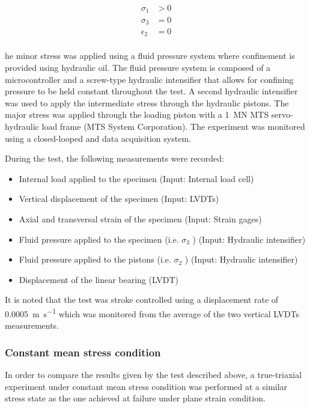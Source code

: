 \begin{align*}
    \sigma_1 &> 0 \\
    \sigma_3 &= 0 \\
    \epsilon_2&= 0 \\
\end{align*}

he minor stress was applied using a fluid pressure system where confinement is provided using hydraulic oil. The fluid pressure system is composed of a microcontroller and a screw-type hydraulic intensifier that allows for confining pressure to be held constant throughout the test. A second hydraulic intensifier was used to apply the intermediate stress through the hydraulic pistons. The major stress was applied through the loading piston with a \SI{1}{\mega\newton} MTS servo-hydraulic load frame (MTS System Corporation). The experiment was monitored using a closed-looped and data acquisition system. 

During the test, the following measurements were recorded: 

\begin{itemize}
    \item Internal load applied to the specimen (Input: Internal load cell)
    \item Vertical displacement of the specimen (Input: LVDTs)
    \item Axial and transversal strain of the specimen (Input: Strain gages)
    \item Fluid pressure applied to the specimen (i.e. $\sigma_3$ ) (Input: Hydraulic intensifier) 
    \item Fluid pressure applied to the pistons (i.e. $\sigma_2$ ) (Input: Hydraulic intensifier)
    \item Displacement of the linear bearing (LVDT)
\end{itemize}

It is noted that the test was stroke controlled using a displacement rate of \SI{0.0005}{\meter\per\second} which was monitored from the average of the two vertical LVDTs measurements.

\subsubsection{Constant mean stress condition}


In order to compare the results given by the test described above, a true-triaxial experiment under constant mean stress condition was performed at a similar stress state as the one achieved at failure under plane strain condition. 


